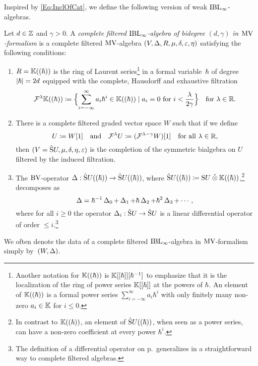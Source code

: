 \documentclass[\MainFolder/Text.tex]{subfiles}
\begin{document}
Inspired by \eqref{Eq:InclOfCat}, we define the following version of weak $\mathrm{IBL}_\infty$-algebras.

\begin{Definition}\label{Def:ComplFiltrIBL}
Let $d\in\mathbb{Z}$ and $\gamma>0$. A \emph{complete filtered $\mathrm{IBL}_\infty$-algebra of bidegree $(d,\gamma)$ in $\mathrm{MV}$-formalism} is a complete filtered $\mathrm{MV}$-algebra $(V,\operatorname{\Delta}, R, \mu, \delta, \varepsilon, \eta)$ satisfying the following conditions:
\begin{enumerate}[label=(\arabic*)]
\item $R=\mathbb{K}((\hbar))$ is the ring of Laurent series\footnote{Another notation for $\mathbb{K}((\hbar))$ is $\mathbb{K}[[\hbar]][\hbar^{-1}]$ to emphasize that it is the localization of the ring of power series $\mathbb{K}[[\hbar]]$ at the powers of $\hbar$. An element of $\mathbb{K}((\hbar))$ is a formal power series $\sum_{i=-\infty}^\infty a_i \hbar^i$ with only finitely many non-zero $a_i\in \mathbb{K}$ for $i\le 0$.} in a formal variable~$\hbar$ of degree $|\hbar| = 2 d$ equipped with the complete, Hausdorff and exhaustive filtration
\begin{equation}\label{Eq:MVFiltr}
\mathcal{F}^\lambda \mathbb{K}((\hbar)) \coloneqq \Bigl\{\sum_{i=-\infty}^\infty a_i \hbar^i \in \mathbb{K}((\hbar)) \mid a_i = 0\text{ for }i<\frac{\lambda}{2\gamma}\Bigr\}\quad\text{for }\lambda\in\mathbb{R}.
\end{equation}
\item There is a complete filtered graded vector space $W$ such that if we define
\begin{equation}\label{Eq:DefOfU}
 U\coloneqq W[1]\quad\text{and}\quad\mathcal{F}^\lambda U \coloneqq (\mathcal{F}^{\lambda - \gamma} W)[1]\quad\text{for all }\lambda\in \mathbb{R},
 \end{equation}
then $(V=\hat{\mathrm{S}} U, \mu, \delta, \eta, \varepsilon)$ is the completion of the symmetric bialgebra on $U$ filtered by the induced filtration.
\item The $\mathrm{BV}$-operator $\operatorname{\Delta}: \hat{\mathrm{S}}U((\hbar))\rightarrow\hat{\mathrm{S}}U((\hbar))$, where $\hat{\Sym}U((\hbar)) \coloneqq \Sym U\COtimes\K((\hbar))$,\footnote{In contrast to $\mathbb{K}((\hbar))$, an element of $\hat{\mathrm{S}}U((\hbar))$, when seen as a power series, can have a non-zero coefficient at every power $\hbar^i$.} decomposes as
\begin{equation}\label{Eq:BVOpDecompRel}
 \operatorname{\Delta} = \hbar^{-1}\operatorname{\Delta}_0 + \operatorname{\Delta}_1 + \hbar\operatorname{\Delta}_2 + \hbar^2 \operatorname{\Delta}_3 + \dotsb,
\end{equation}
where for all $i\ge 0$ the operator $\operatorname{\Delta}_i: \hat{\mathrm{S}}U \rightarrow \hat{\mathrm{S}}U$ is a linear differential operator of order $\le i$.\footnote{The definition of a differential operator on p.\,\pageref{Page:DiffOp} generalizes in a straightforward way to complete filtered algebras.}
\end{enumerate}
We often denote the data of a complete filtered $\mathrm{IBL}_\infty$-algebra in $\mathrm{MV}$-formalism simply by~$(W,\operatorname{\Delta})$. 
 

\end{Definition}
\end{document}
